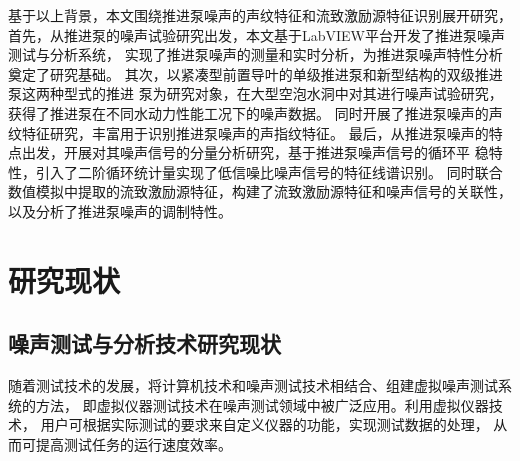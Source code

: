 基于以上背景，本文围绕推进泵噪声的声纹特征和流致激励源特征识别展开研究，
首先，从推进泵的噪声试验研究出发，本文基于LabVIEW平台开发了推进泵噪声测试与分析系统，
实现了推进泵噪声的测量和实时分析，为推进泵噪声特性分析奠定了研究基础。 
其次，以紧凑型前置导叶的单级推进泵和新型结构的双级推进泵这两种型式的推进
泵为研究对象，在大型空泡水洞中对其进行噪声试验研究，获得了推进泵在不同水动力性能工况下的噪声数据。
同时开展了推进泵噪声的声纹特征研究，丰富用于识别推进泵噪声的声指纹特征。
最后，从推进泵噪声的特点出发，开展对其噪声信号的分量分析研究，基于推进泵噪声信号的循环平
稳特性，引入了二阶循环统计量实现了低信噪比噪声信号的特征线谱识别。
同时联合数值模拟中提取的流致激励源特征，构建了流致激励源特征和噪声信号的关联性，以及分析了推进泵噪声的调制特性。

\begin{comment}

目前针对推进泵流致激励特性的研究已经开展了大量工作，研究主要集中通过数值模拟获取
压力脉动特性、激振力特性等方面，难以通过试验精确获取流致激励源特征。
其中蕴含着丰富的流致激励
源信息，但是传统的频谱分析及解调方法无法实现高精度低频调制特征的提取。

\end{comment}

\section{研究现状}
\subsection{噪声测试与分析技术研究现状}
\begin{comment}
水下环境噪声数据采集装置对于水声试验来说是不可缺少的，因此设计
一套高性能的、能够适应水声信号特点的数据采集
系统十分必要。水声信号在水中传播时，水中的自然
环境极其复杂，要求所采用的数据采集器能够适应水下恶劣的自然环境，不但具有较大的动态范围，
所采集信号的幅度范围要尽可能宽，而且试验现场的数据量很大，常常需要多通道同步进行数据采集，
这样，对数据采集器提出了很高的要求。另外，从节约成本的角度考虑，又要求所采用的系统应该具有
一定的通用性和灵活的扩展能力。文中所要完成的
工作正是基于这一目的而展开的。

随着测试技术的发展，目前对传统的复杂仪器，分析方法的依赖性在减少，而正在流行着一种 
将计算机技术和噪声测试技术相结合、组建虚拟噪 
声测试系统的方法，即将虚拟仪器技术的测试技术 
引到噪声测试领域中，借助计算机软件技术来设计 
噪声分析软件。


\end{comment}
随着测试技术的发展，将计算机技术和噪声测试技术相结合、组建虚拟噪声测试系统的方法，
即虚拟仪器测试技术在噪声测试领域中被广泛应用\cite{yu2018}。利用虚拟仪器技术，
用户可根据实际测试的要求来自定义仪器的功能，实现测试数据的处理，
从而可提高测试任务的运行速度效率\cite{tang2021}。

